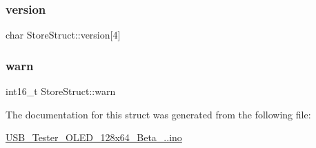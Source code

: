 \subsubsection{\texorpdfstring{version}{version}}
{\footnotesize\ttfamily char Store\+Struct\+::version\mbox{[}4\mbox{]}}

\hypertarget{struct_store_struct_a93d497d95b3d32461b72e9140bbc37e2}{}\label{struct_store_struct_a93d497d95b3d32461b72e9140bbc37e2} 
\subsubsection{\texorpdfstring{warn}{warn}}
{\footnotesize\ttfamily int16\+\_\+t Store\+Struct\+::warn}



The documentation for this struct was generated from the following file\+:\begin{DoxyCompactItemize}
\item 
\hyperlink{_u_s_b___tester___o_l_e_d__128x64___beta__2_82_8ino}{U\+S\+B\+\_\+\+Tester\+\_\+\+O\+L\+E\+D\+\_\+128x64\+\_\+\+Beta\+\_..\+ino}\end{DoxyCompactItemize}
